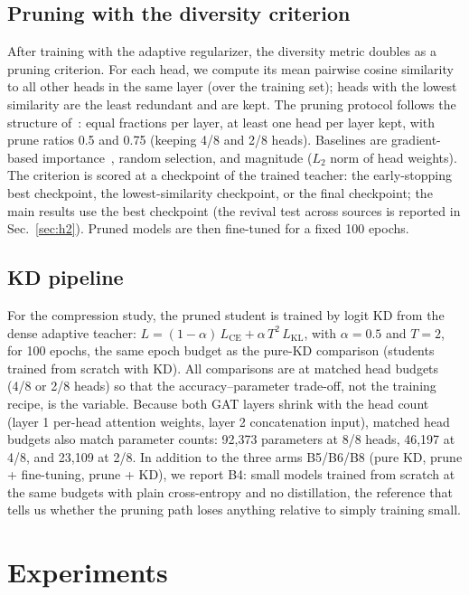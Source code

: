 \documentclass{ws-ijprai}
\begin{document}
\subsection{Pruning with the diversity criterion}

After training with the adaptive regularizer, the diversity metric doubles as a
pruning criterion. For each head, we compute its mean pairwise cosine
similarity to all other heads in the same layer (over the training set); heads
with the lowest similarity are the least redundant and are kept. The pruning
protocol follows the structure of~\cite{michel2019}: equal fractions per layer,
at least one head per layer kept, with prune ratios 0.5 and 0.75 (keeping 4/8
and 2/8 heads). Baselines are gradient-based importance~\cite{michel2019},
random selection, and magnitude ($L_2$ norm of head weights). The criterion is
scored at a checkpoint of the trained teacher: the early-stopping best
checkpoint, the lowest-similarity checkpoint, or the final checkpoint; the
main results use the best checkpoint (the revival test across sources is
reported in Sec.~\ref{sec:h2}). Pruned models are then fine-tuned for a fixed
100 epochs.

\subsection{KD pipeline}

For the compression study, the pruned student is trained by logit KD from the
dense adaptive teacher: $L = (1-\alpha)\,L_{\mathrm{CE}} + \alpha\, T^2\,
L_{\mathrm{KL}}$, with $\alpha = 0.5$ and $T = 2$, for 100 epochs, the same
epoch budget as the pure-KD comparison (students trained from scratch with KD).
All comparisons are at matched head budgets (4/8 or 2/8 heads) so that the
accuracy--parameter trade-off, not the training recipe, is the variable.
Because both GAT layers shrink with the head count (layer 1 per-head
attention weights, layer 2 concatenation input), matched head budgets also
match parameter counts: 92{,}373 parameters at 8/8 heads, 46{,}197 at 4/8, and
23{,}109 at 2/8. In addition to the three arms B5/B6/B8 (pure KD, prune +
fine-tuning, prune + KD), we report B4: small models trained from scratch at
the same budgets with plain cross-entropy and no distillation, the
reference that tells us whether the pruning path loses anything relative to
simply training small.

\section{Experiments}
\end{document}
